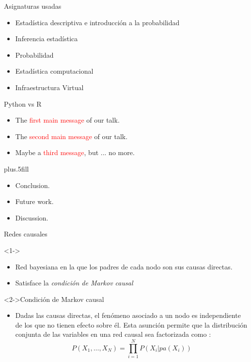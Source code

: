 \documentclass{beamer}
\begin{document}
\begin{frame}{Asignaturas usadas}
	\begin{itemize}
		\item Estadística descriptiva e introducción a la probabilidad 
		\item Inferencia estadística 
		\item Probabilidad 
		\item Estadística computacional 
		\item Infraestructura Virtual
	\end{itemize}
\end{frame}

\begin{frame}{Python vs R}
	\begin{itemize}
		\item The \textcolor{red}{first main message} of our talk.
		\item The \textcolor{red}{second main message} of our talk.
		\item Maybe a \textcolor{red}{third message}, but ... no more.
	\end{itemize}
	\vskip0pt plus.5fill
	\begin{itemize}
		\item Conclusion.
	\end{itemize}
	\begin{itemize}
		\item Future work.
		\item Discussion.
	\end{itemize}
\end{frame}

\begin{frame}{Redes causales}
   \begin{block}
        <1->{}
            \begin{itemize}
                \item Red bayesiana en la que los padres de cada nodo son sus causas directas.
                \item Satisface la {\em condición de Markov causal}
            \end{itemize}
    \end{block}
    \begin{exampleblock}
        <2->{Condición de Markov causal}
            \begin{itemize}
                \item Dadas las causas directas, el fenómeno asociado a un nodo es independiente de 
                los que no tienen efecto sobre él. Esta asunción permite que la distribución 
                conjunta de las variables en una red causal sea factorizada como :
                $$ P(X_{1}, \dots,X_{N}) = \prod_{i=1}^{N} P(X_{i} | pa(X_{i}))$$ 
            \end{itemize}
    \end{exampleblock}
\end{frame}
\end{document}
